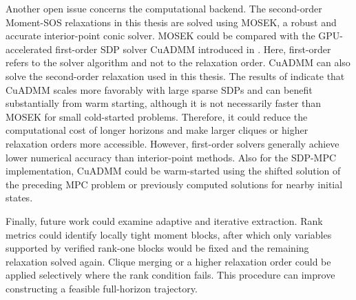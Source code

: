 Another open issue concerns the computational backend. The second-order Moment-SOS relaxations 
in this thesis are solved using MOSEK, a robust and accurate interior-point conic solver. MOSEK could be 
compared with the GPU-accelerated first-order SDP solver CuADMM introduced in \cite{Kang_2026Fast}. Here, 
first-order refers to the solver algorithm and not to the relaxation order. CuADMM can also solve the 
second-order relaxation used in this thesis. The results of \cite{Kang_2026Fast} indicate that CuADMM 
scales more favorably with large sparse SDPs and can benefit substantially from warm starting, although 
it is not necessarily faster than MOSEK for small cold-started problems. Therefore, it could reduce the 
computational cost of longer horizons and make larger cliques or higher relaxation orders more accessible. 
However, 
first-order solvers generally achieve lower numerical accuracy than interior-point methods. Also for the 
SDP-MPC implementation, CuADMM could be warm-started using the shifted solution of the 
preceding MPC problem or 
previously computed solutions for nearby initial states.

Finally, future work could examine adaptive and iterative extraction. Rank metrics
could identify locally tight moment blocks, after which only variables supported by
verified rank-one blocks would be fixed and the remaining relaxation solved again.
Clique merging or a higher relaxation order could be applied selectively where the
rank condition fails. This procedure can improve constructing a feasible full-horizon
trajectory.

